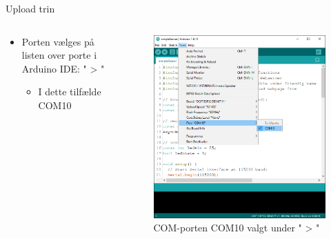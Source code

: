 \documentclass[aspectratio=169]{beamer}
\begin{document}
\begin{frame}{Upload trin}
\begin{columns}

	\begin{column}{0.5\textwidth}
		\begin{textBox}
			\begin{itemize}
				\item Porten vælges på listen over porte i Arduino IDE: " > "
				\begin{itemize}
					\item I dette tilfælde COM10
				\end{itemize}								
			\end{itemize}
		\end{textBox}
	\end{column}
	
	\begin{column}{0.5\textwidth}
		\begin{figure}
  			\includegraphics[height=0.6\textheight,keepaspectratio=true]{assets/pictures/comport.png}
  			\caption{COM-porten COM10 valgt under " > "}
  			\label{fig:comport}
		\end{figure}
	\end{column}

\end{columns}
\end{frame}
\end{document}

